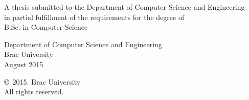 

\begin{titlepage}
\renewcommand*{\thepage}{Title} %
    \begin{center} 
        \vspace*{3cm} %
        
        {\fontsize{16pt}{22pt}\selectfont{Predicting a T20 Cricket Match Result While \\
        The Match is in Progress}
        } 
        
        \vspace{1.5cm}
        
        
        \vspace{0.5cm}
            \color{\studentonecolor}
        	\studentonename\\\studentoneid\\
        	\color{\studenttwocolor}
	        \studenttwoname\\\studenttwoid\\
	        \color{\studentthreecolor}
	        \studentthreename\\\studentthreeid\\
	        \color{\studentfourcolor}
	        \studentfourname\\\studentfourid\\
	        \color{\studentfivecolor}
	        \studentfivename\\\studentfiveid\\ %
            \color{black}
        \vspace{1.5cm}
        
        	A thesis submitted to the Department of Computer Science and Engineering\\
            in partial fulfillment of the requirements for the degree of\\
            B.Sc. in Computer Science

        
        \vspace{2.5cm}
        
    		Department of Computer Science and Engineering\\
            Brac University\\
            August 2015
        
        \vspace{3cm}
        
    		\copyright\ 2015. Brac University\\
            All rights reserved.
    
    \end{center}

\end{titlepage}